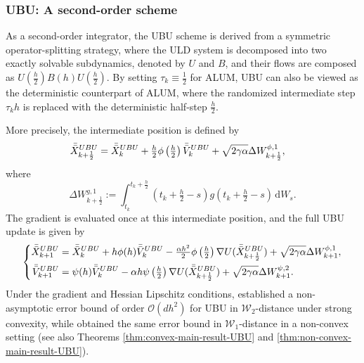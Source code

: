\documentclass[12pt]{article}
\numberwithin{equation}{section}
\begin{document}
\subsubsection{UBU: A second-order scheme}


As a second-order integrator, the UBU scheme \cite{zapatero2017word} is derived from a
symmetric operator-splitting strategy, where the ULD system is
decomposed into two exactly solvable subdynamics, denoted by $U$
and $B$, and their flows are composed as
$U(\frac h2)B(h)U(\frac h2)$.
%
By setting $\tau_k\equiv\frac12$ for ALUM, UBU can also be viewed as the deterministic counterpart of ALUM, where the
randomized intermediate step $\tau_kh$ is replaced with the deterministic
half-step $\frac h2$. 

More precisely, the intermediate position is defined by
\begin{equation}
\label{eq:intro-UBU-midpoint}
\begin{aligned}
\Bar{\Bar{X}}_{k+\frac12}^{UBU}
={}&
\Bar{\Bar{X}}_{k}^{UBU}
+
\tfrac{h}{2}
\phi\left(\tfrac{h}{2}\right)
\Bar{\Bar{V}}_{k}^{UBU}
+
\sqrt{2\gamma\alpha}
\Delta W_{k+\frac{1}{2}}^{\phi,1},
\end{aligned}
\end{equation}
where
\begin{equation}
\label{eq:define-Delta-W-t+1/2h}
\Delta W_{k+\frac{1}{2}}^{g,1}
:=
\int_{t_k}^{t_k+\frac{h}{2}}
(t_k+\tfrac{h}{2}-s)
g(t_k+\tfrac{h}{2}-s)\,\mathrm dW_s.
\end{equation}
The gradient is evaluated once at this intermediate position,
and the full UBU update is given by
\begin{equation}
\label{eq:intro-UBU}
\left\{
\begin{aligned}
\Bar{\Bar{X}}_{k+1}^{UBU}
={}&
\Bar{\Bar{X}}_{k}^{UBU}
+
h\phi(h)\Bar{\Bar{V}}_{k}^{UBU}
-
\tfrac{\alpha h^2}{2}
\phi\left(\tfrac{h}{2}\right)
\nabla U
(
\Bar{\Bar{X}}_{k+\frac12}^{UBU}
)
+
\sqrt{2\gamma\alpha}
\Delta W_{k+1}^{\phi,1},
\\
\Bar{\Bar{V}}_{k+1}^{UBU}
={}&
\psi(h)\Bar{\Bar{V}}_{k}^{UBU}
-
\alpha h
\psi\left(\tfrac{h}{2}\right)
\nabla U(
\Bar{\Bar{X}}_{k+\frac12}^{UBU}
)
+
\sqrt{2\gamma\alpha}
\Delta W_{k+1}^{\psi,2}.
\end{aligned}
\right.
\end{equation}
Under the gradient and Hessian Lipschitz conditions,
\cite{sanz2021wasserstein} established a non-asymptotic error bound of order
$\mathcal O(dh^2)$ for UBU in $\mathcal W_2$-distance under
strong convexity, while \cite{schuh2024convergence} obtained the same error bound in $\mathcal W_1$-distance in a non-convex
setting (see also Theorems \ref{thm:convex-main-result-UBU} and \ref{thm:non-convex-main-result-UBU}).
\end{document}
